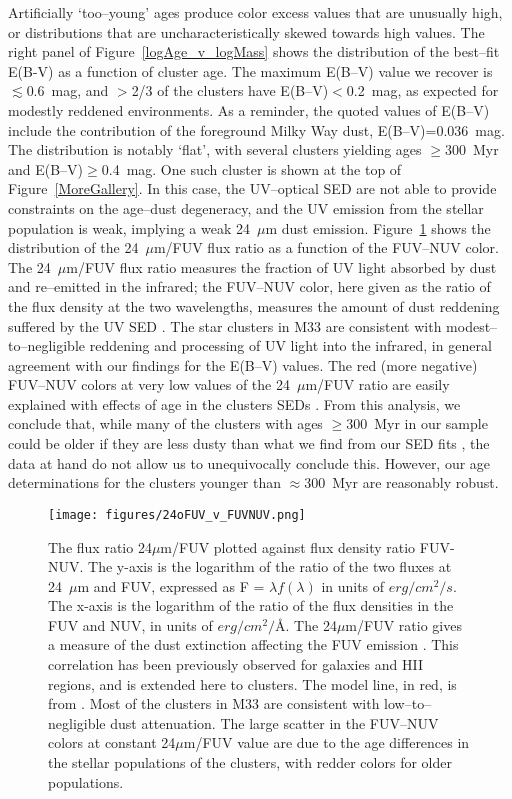 \documentclass{aastex63}
\begin{document}
Artificially `too--young' ages produce color excess values that are unusually high, or distributions that are uncharacteristically skewed towards high values. The right panel of Figure~\ref{logAge_v_logMass} shows the distribution of the best--fit E(B-V) as a function of cluster age. The maximum E(B--V) value we recover is $\lesssim$0.6~mag, and $>$2/3 of the clusters have E(B--V)$<$0.2~mag, as expected for modestly reddened environments. As a reminder, the quoted values of E(B--V) include the contribution of the foreground Milky Way dust, E(B--V)=0.036~mag. The distribution is notably `flat', with several clusters yielding ages $\ge$300~Myr and E(B--V)$\ge$0.4~mag. One such cluster is shown at the top of Figure~\ref{MoreGallery}. In this case, the UV--optical SED are not able to provide constraints on the age--dust degeneracy, and the UV emission from the stellar population is weak, implying a weak 24~$\mu$m dust emission. Figure~\ref{24oFUV v FUV-NUV} shows the distribution of the 24~$\mu$m/FUV flux ratio as a function of the FUV--NUV color. The  24~$\mu$m/FUV flux ratio measures the fraction of UV light absorbed by dust and re--emitted in the infrared; the FUV--NUV color, here given as the ratio of the flux density at the two wavelengths, measures the amount of dust reddening suffered by the UV SED \citep{Meurer+1999, Calzetti+2000}. The star clusters in M33 are consistent with modest--to--negligible  reddening and processing of UV light into the infrared, in general agreement with our findings for the E(B--V) values. The red (more negative) FUV--NUV colors at very low values of the 24~$\mu$m/FUV ratio are easily explained with effects of age in the clusters SEDs \citep{Calzetti+2005, Cortese+2006}. From this analysis, we conclude that, while many of the  clusters with ages $\ge$300~Myr in our sample could be older if they are less dusty than what we find from our SED fits \citep[see discussion in][]{Whitmore+2020}, the data at hand do not allow us to unequivocally conclude this. However, our age determinations for the clusters younger than $\approx$300~Myr are reasonably robust. 

\begin{figure}
 \centering
 \texttt{[image: figures/24oFUV\_v\_FUVNUV.png]}
    \caption{The flux ratio 24$\mu$m/FUV plotted against flux density ratio FUV-NUV. The y-axis is the logarithm of the ratio of the two fluxes at 24~$\mu$m and FUV, expressed as F = $\lambda f(\lambda)$ in units of $erg/cm^{2}/s$. The x-axis is the logarithm of the ratio of the flux densities in the FUV and NUV, in units of $erg/cm^{2}/$\r{A}. The 24$\mu$m/FUV ratio gives a measure of the dust extinction affecting the FUV emission \citep{Meurer+1999}. This correlation has been previously observed for galaxies and HII regions, and is extended here to clusters. The model line, in red, is from \citet{Calzetti+2005}. Most of the clusters in M33 are consistent with low--to--negligible dust attenuation. The large scatter in the FUV--NUV colors at constant 24$\mu$m/FUV value are due to the age differences in the stellar populations of the  clusters, with redder colors for older populations.}
        \label{24oFUV v FUV-NUV}
\end{figure}
\end{document}
